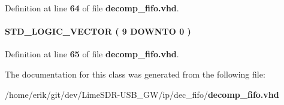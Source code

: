 Definition at line {\bf 64} of file {\bf decomp\+\_\+fifo.\+vhd}.

\paragraph[{sub\+\_\+wire3}]{ {\bfseries \textcolor{comment}{S\+T\+D\+\_\+\+L\+O\+G\+I\+C\+\_\+\+V\+E\+C\+T\+OR}\textcolor{vhdlchar}{ }\textcolor{vhdlchar}{(}\textcolor{vhdlchar}{ }\textcolor{vhdlchar}{ } \textcolor{vhdldigit}{9} \textcolor{vhdlchar}{ }\textcolor{keywordflow}{D\+O\+W\+N\+TO}\textcolor{vhdlchar}{ }\textcolor{vhdlchar}{ } \textcolor{vhdldigit}{0} \textcolor{vhdlchar}{ }\textcolor{vhdlchar}{)}\textcolor{vhdlchar}{ }} \hspace{0.3cm}{\ttfamily [Signal]}}\label{classdecomp__fifo_1_1SYN_a17dc130b7a96e1f7292db92b977218a8}


Definition at line {\bf 65} of file {\bf decomp\+\_\+fifo.\+vhd}.



The documentation for this class was generated from the following file\+:\begin{DoxyCompactItemize}
\item 
/home/erik/git/dev/\+Lime\+S\+D\+R-\/\+U\+S\+B\+\_\+\+G\+W/ip/dec\+\_\+fifo/{\bf decomp\+\_\+fifo.\+vhd}\end{DoxyCompactItemize}
